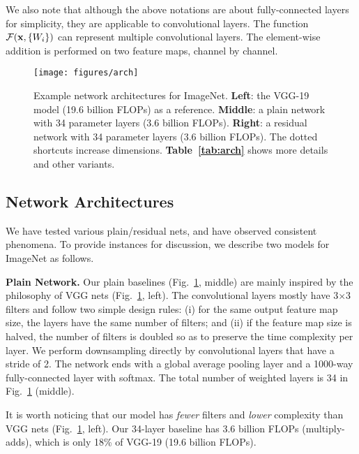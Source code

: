 We also note that although the above notations are about fully-connected layers for simplicity, they are applicable to convolutional layers. The function $\mathcal{F}(\mathbf{x}, \{W_{i}\})$ can represent multiple convolutional layers. The element-wise addition is performed on two feature maps, channel by channel.

\begin{figure}[t]
\begin{center}
\vspace{.5em}
\texttt{[image: figures/arch]}
\end{center}
\caption{Example network architectures for ImageNet. \textbf{Left}: the VGG-19 model \cite{Simonyan2015} (19.6 billion FLOPs) as a reference. \textbf{Middle}: a plain network with 34 parameter layers (3.6 billion FLOPs). \textbf{Right}: a residual network with 34 parameter layers (3.6 billion FLOPs). The dotted shortcuts increase dimensions. \textbf{Table~\ref{tab:arch}} shows more details and other variants.}
\label{fig:arch}
\vspace{-1em}
\end{figure}

\subsection{Network Architectures}

We have tested various plain/residual nets, and have observed consistent phenomena. To provide instances for discussion, we describe two models for ImageNet as follows.

\vspace{6pt}
\noindent\textbf{Plain Network.}
Our plain baselines (Fig.~\ref{fig:arch}, middle) are mainly inspired by the philosophy of VGG nets \cite{Simonyan2015} (Fig.~\ref{fig:arch}, left).
The convolutional layers mostly have 3$\times$3 filters and follow two simple design rules: (i) for the same output feature map size, the layers have the same number of filters; and (ii) if the feature map size is halved, the number of filters is doubled so as to preserve the time complexity per layer. We perform downsampling directly by convolutional layers that have a stride of 2.
The network ends with a global average pooling layer and a 1000-way fully-connected layer with softmax. The total number of weighted layers is 34 in Fig.~\ref{fig:arch} (middle).

It is worth noticing that our model has \emph{fewer} filters and \emph{lower} complexity than VGG nets \cite{Simonyan2015} (Fig.~\ref{fig:arch}, left). Our 34-layer baseline has 3.6 billion FLOPs (multiply-adds), which is only 18\% of VGG-19 (19.6 billion FLOPs).

